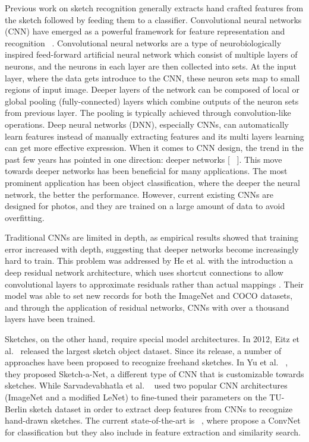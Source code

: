 \documentclass[10pt,twocolumn,letterpaper]{article}
\begin{document}
Previous work on sketch recognition generally extracts hand crafted features from the sketch followed by feeding them to a classifier.  Convolutional neural networks (CNN) have emerged as a powerful framework for feature representation and recognition ~\cite{krizhevsky2012imagenet}.  Convolutional neural networks are a type of neurobiologically inspired feed-forward artificial neural network which consist of multiple layers of neurons,  and  the neurons in each layer are then collected into sets. At the input layer, where the data gets introduce to the CNN, these neuron sets map to small regions of input image. Deeper layers of the network can be composed of local or global pooling (fully-connected) layers which combine outputs of the neuron sets from previous layer. The pooling is typically achieved through convolution-like operations. Deep neural networks (DNN), especially CNNs, can automatically learn features instead of manually extracting features and its multi layers learning can get more effective expression. When it comes to CNN design, the trend in the past few years has pointed in one direction: deeper networks [ ~\cite{krizhevsky2012imagenet}]. This move towards deeper networks  has been beneficial for many applications. The most prominent application has been object classification, where the deeper the neural network, the better the performance. However, current existing CNNs are designed for photos, and they are trained on a large amount of data to avoid overfitting. 

Traditional CNNs are limited in depth, as empirical results showed that training error increased with depth, suggesting that deeper networks become increasingly hard to train. This problem was addressed by He et al. with the introduction a deep residual network architecture, which uses shortcut connections to allow convolutional layers to approximate residuals rather than actual mappings \cite{hekaming2016}. Their model was able to set new records for both the ImageNet and COCO datasets, and through the application of residual networks, CNNs with over a thousand layers have been trained.

Sketches, on the other hand, require special model architectures. In 2012, Eitz et al.~\cite{eitz2012hdhso} released the largest sketch object dataset. Since its release, a number of approaches have been proposed to recognize freehand sketches.  In Yu et al. ~\cite{yu2016sketch}, they proposed Sketch-a-Net, a different type of CNN that is customizable towards sketches. While Sarvadevabhatla et al. ~\cite{sarvadevabhatla2015freehand} used two popular CNN architectures (ImageNet and a modified LeNet) to fine-tuned their parameters on the TU-Berlin sketch dataset in order to extract deep features from CNNs to recognize hand-drawn sketches. The current state-of-the-art is ~\cite{seddati2016deepsketch}, where propose a ConvNet for classification but they also include in feature extraction and similarity search. 
\end{document}
